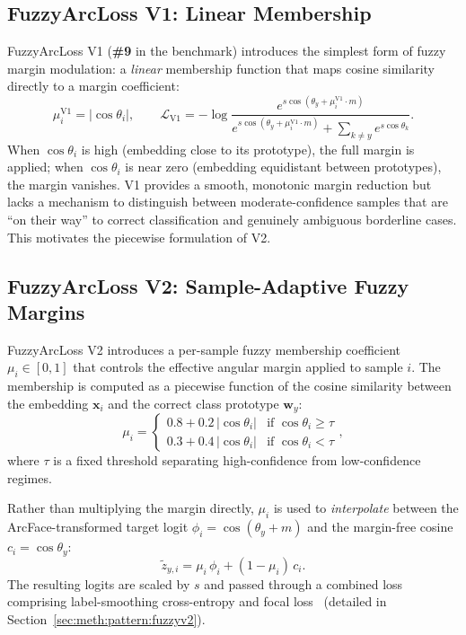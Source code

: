 \subsection{FuzzyArcLoss V1: Linear Membership}
\label{sec:bg:fuzzyarcloss_v1}

FuzzyArcLoss V1 (\textbf{\#9} in the benchmark) introduces the simplest form of fuzzy margin modulation: a \emph{linear} membership function that maps cosine similarity directly to a margin coefficient:
\begin{equation}
\label{eq:fuzzy_v1}
\mu_i^{\text{V1}} = |\cos\theta_i|, \qquad
\mathcal{L}_{\text{V1}} = -\log \frac{e^{s \cos(\theta_y + \mu_i^{\text{V1}} \cdot m)}}{e^{s \cos(\theta_y + \mu_i^{\text{V1}} \cdot m)} + \sum_{k \neq y} e^{s \cos\theta_k}}.
\end{equation}
When $\cos\theta_i$ is high (embedding close to its prototype), the full margin is applied; when $\cos\theta_i$ is near zero (embedding equidistant between prototypes), the margin vanishes.
V1 provides a smooth, monotonic margin reduction but lacks a mechanism to distinguish between moderate-confidence samples that are ``on their way'' to correct classification and genuinely ambiguous borderline cases.
This motivates the piecewise formulation of V2.


\subsection{FuzzyArcLoss V2: Sample-Adaptive Fuzzy Margins}
\label{sec:bg:fuzzyarcloss_v2}

FuzzyArcLoss V2 introduces a per-sample fuzzy membership coefficient $\mu_i \in [0, 1]$ that controls the effective angular margin applied to sample $i$.
The membership is computed as a piecewise function of the cosine similarity between the embedding $\mathbf{x}_i$ and the correct class prototype $\mathbf{w}_y$:
\begin{equation}
\label{eq:fuzzy_membership}
\mu_i = \begin{cases}
0.8 + 0.2\,|\cos\theta_i| & \text{if } \cos\theta_i \geq \tau \\
0.3 + 0.4\,|\cos\theta_i| & \text{if } \cos\theta_i < \tau
\end{cases},
\end{equation}
where $\tau$ is a fixed threshold separating high-confidence from low-confidence regimes.

Rather than multiplying the margin directly, $\mu_i$ is used to \emph{interpolate} between the ArcFace-transformed target logit $\phi_i = \cos(\theta_y + m)$ and the margin-free cosine $c_i = \cos\theta_y$:
\begin{equation}
\label{eq:fuzzyarcloss_v2}
\tilde{z}_{y,i} = \mu_i \, \phi_i + (1 - \mu_i) \, c_i.
\end{equation}
The resulting logits are scaled by $s$ and passed through a combined loss comprising label-smoothing cross-entropy and focal loss~\cite{lin2017focal} (detailed in Section~\ref{sec:meth:pattern:fuzzyv2}).

